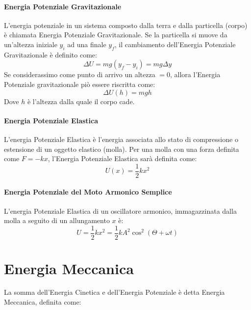         \paragraph{Energia Potenziale Gravitazionale} L'energia potenziale in un
        sistema composto dalla terra e dalla particella (corpo) è chiamata 
        Energia Potenziale Gravitazionale. Se la particella si muove da 
        un'altezza iniziale $y_i$ ad una finale $y_f$, il cambiamento 
        dell'Energia Potenziale Gravitazionale è definito come:
        \begin{equation}
            \Delta U = mg(y_f - y_i) = mg \Delta y
        \end{equation}
        Se considerassimo come punto di arrivo un altezza $= 0$, allora 
        l'Energia Potenziale gravitazionale piò essere riscritta come:
        \begin{equation}
            \Delta U(h) = mgh
        \end{equation}
        Dove $h$ è l'altezza dalla quale il corpo cade.

        \paragraph{Energia Potenziale Elastica} L'energia Potenziale Elastica è 
        l'energia associata allo stato di compressione o estensione di un 
        oggetto elastico (molla). Per una molla con una forza definita come 
        $ F = -kx $, l'Energia Potenziale Elastica sarà definita come:
        \begin{equation}
            U(x)     = \frac{1}{2}kx^2
        \end{equation}

        \paragraph{Energia Potenziale del Moto Armonico Semplice} L'energia 
        Potenziale Elastica di un oscillatore armonico, immagazzinata dalla 
        molla a seguito di un allungamento $x$ è:
        \begin{equation}
            U = \frac{1}{2}kx^2 = \frac{1}{2}kA^2\cos^2(\Theta + \omega t)
        \end{equation}

    \section{Energia Meccanica} La somma dell'Energia Cinetica e dell'Energia
    Potenziale è detta Energia Meccanica, definita come:

